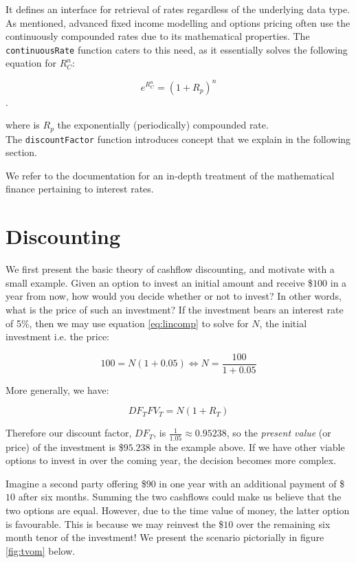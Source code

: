 It defines an interface for retrieval of rates regardless of the underlying
data type. As mentioned, advanced fixed income modelling and options pricing
often use the continuously compounded rates due to its mathematical 
properties\cite{HULL}. The \texttt{continuousRate} function caters to this
need, as it essentially solves the following equation for $R_C^n$:

\begin{equation}
e^{R_C^n} = (1+R_p)^n
\end{equation}.

where is $R_p$ the exponentially (periodically) compounded rate.\\

The \texttt{discountFactor} function introduces concept that we
explain in the following section.

We refer to the \hql documentation\cite{hqldoc} for an in-depth treatment of the
mathematical finance pertaining to interest rates.

\section{Discounting}\label{sec:discounting}

We first present the basic theory of cashflow discounting, and motivate with
a small example. Given an option to invest an initial amount and receive 
\$$100$ in a year from now, how would you decide whether or not to invest? In
other words, what is the price of such an investment? If the investment bears
an interest rate of 5\%, then we may use equation \ref{eq:lincomp} to solve
for $N$, the initial investment i.e. the price:

\begin{equation}
100 = N (1 + 0.05) \Leftrightarrow N = \frac{100}{1+0.05}
\end{equation}

More generally, we have:

\begin{equation}
DF_T FV_T= N (1 + R_T)
\end{equation}

Therefore our discount factor, $DF_T$, is $\frac{1}{1.05} \approx 0.95238$,
so the \emph{present value} (or price) of the investment is \$$95.238$
in the example above. If we have other viable options to invest in over the coming
year, the decision becomes more complex.

Imagine a second party offering \$$90$ in one year with an additional payment of
\$$10$ after six months. Summing the two cashflows could make us believe that the
two options are equal. However, due to the time value of money, the latter option
is favourable. This is because we may reinvest the \$$10$ over the remaining six
month tenor of the investment! We present the scenario pictorially in figure
\ref{fig:tvom} below.


